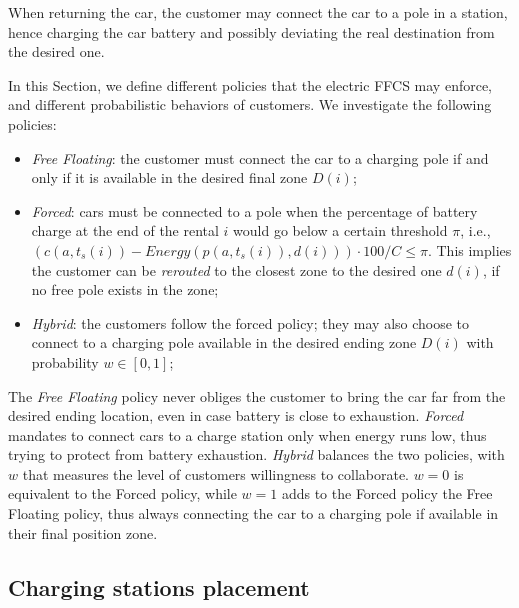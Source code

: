 When returning the car, the customer may connect the car to a pole in a station, hence charging the car battery and possibly deviating the real destination from the desired one.

In this Section, we define different policies that the electric FFCS may enforce, and different probabilistic behaviors of customers. 
We investigate the following policies:
\begin{itemize}
 	\item{\it Free Floating}: the customer must connect the car to a charging pole if and only if it is available in the desired final zone $D(i)$;
 	\item{\it Forced}: cars must be connected to a pole when the percentage of battery charge at the end of the rental $i$ would go below a certain threshold $\pi$, i.e., $(c(a,t_{s}(i)) - Energy(p(a,t_{s}(i)), d(i))) \cdot 100/ C\leq  \pi $. This implies the customer can be \textit{rerouted} to the closest zone to the desired one $d(i)$, if no free pole exists in the zone; %
 	\item{\it Hybrid}: the customers follow the forced policy; they may  also choose to connect to a charging pole available in the desired ending zone $D(i)$ with probability $w\in [0,1]$;
\end{itemize}

The \textit{Free Floating} policy never obliges the customer to bring the car far from the desired ending location, even in case battery is close to exhaustion.
\textit{Forced} mandates to connect cars to a charge station only when energy runs low, thus trying to protect from battery exhaustion.
\textit{Hybrid} balances the two policies, with $w$ that measures the level of customers willingness to collaborate. $w=0$ is equivalent to the Forced policy, while $w=1$ adds to the Forced policy the Free Floating policy,  thus always connecting the car to a charging pole if available in their final position zone.

\subsection{Charging stations placement}

